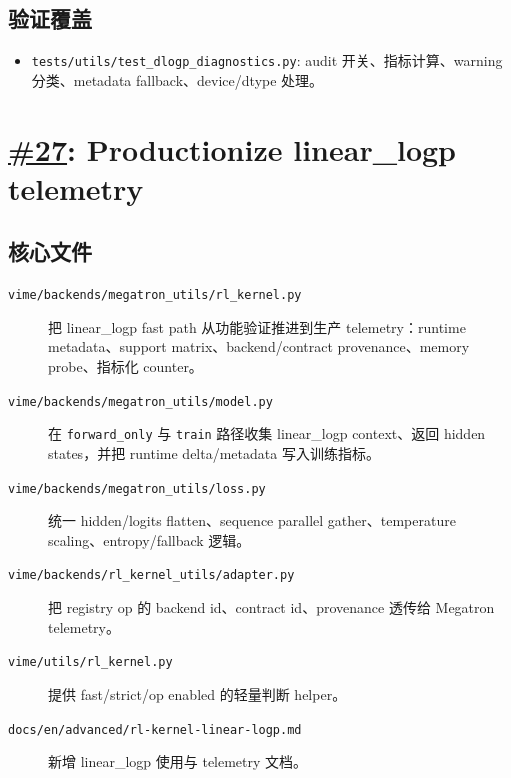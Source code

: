 \documentclass[11pt,a4paper]{ctexart}
\newcommand{\code}[1]{{\small\nolinkurl{#1}}}
\newcommand{\pr}[1]{\href{https://github.com/RL-Align/vime/pull/#1}{\##1}}
\newcommand{\fileitem}[2]{\item[\code{#1}] #2}
\begin{document}
\subsection{验证覆盖}
\begin{itemize}
  \item \code{tests/utils/test_dlogp_diagnostics.py}: audit 开关、指标计算、warning 分类、metadata fallback、device/dtype 处理。
\end{itemize}

\section{\pr{27}: Productionize linear\_logp telemetry}

\subsection{核心文件}
\begin{description}
  \fileitem{vime/backends/megatron_utils/rl_kernel.py}{把 linear\_logp fast path 从功能验证推进到生产 telemetry：runtime metadata、support matrix、backend/contract provenance、memory probe、指标化 counter。}
  \fileitem{vime/backends/megatron_utils/model.py}{在 \code{forward_only} 与 \code{train} 路径收集 linear\_logp context、返回 hidden states，并把 runtime delta/metadata 写入训练指标。}
  \fileitem{vime/backends/megatron_utils/loss.py}{统一 hidden/logits flatten、sequence parallel gather、temperature scaling、entropy/fallback 逻辑。}
  \fileitem{vime/backends/rl_kernel_utils/adapter.py}{把 registry op 的 backend id、contract id、provenance 透传给 Megatron telemetry。}
  \fileitem{vime/utils/rl_kernel.py}{提供 fast/strict/op enabled 的轻量判断 helper。}
  \fileitem{docs/en/advanced/rl-kernel-linear-logp.md}{新增 linear\_logp 使用与 telemetry 文档。}
\end{description}
\end{document}
